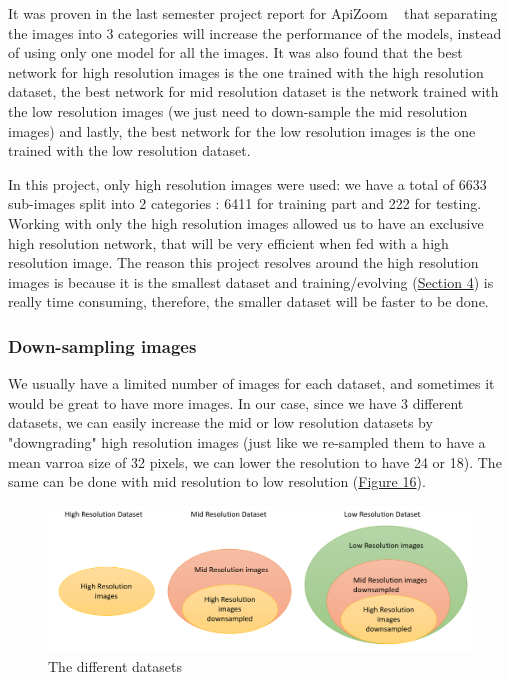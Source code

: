 \documentclass{article}
\begin{document}
\bigskip

It was proven in the last semester project report for ApiZoom ~\cite{stefano} that separating the images into 3 categories will increase the performance of the models, instead of using only one model for all the images. It was also found that the best network for high resolution images is the one trained with the high resolution dataset, the best network for mid resolution dataset is the network trained with the low resolution images (we just need to down-sample the mid resolution images) and lastly, the best network for the low resolution images is the one trained with the low resolution dataset.

\bigskip

In this project, only high resolution images were used: we have a total of 6633 sub-images split into 2 categories : 6411 for training part and 222 for testing. Working with only the high resolution images allowed us to have an exclusive high resolution network, that will be very efficient when fed with a high resolution image. The reason this project resolves around the high resolution images is because it is the smallest dataset and training/evolving (\hyperref[section 4]{Section 4}) is really time consuming, therefore, the smaller dataset will be faster to be done.

\bigskip

\subsubsection{Down-sampling images}

We usually have a limited number of images for each dataset, and sometimes it would be great to have more images. 
In our case, since we have 3 different datasets, we can easily increase the mid or low resolution datasets by "downgrading" high resolution images (just like we re-sampled them to have a mean varroa size of 32 pixels, we can lower the resolution to have 24 or 18). The same can be done with mid resolution to low resolution (\hyperref[Figure 16]{Figure 16}).

\begin{figure}[!ht]
  \centering
  \includegraphics[scale=0.45]{dataset/datasets.PNG}
  \caption{The different datasets}
  \label{Figure 16}
\end{figure}
\end{document}
